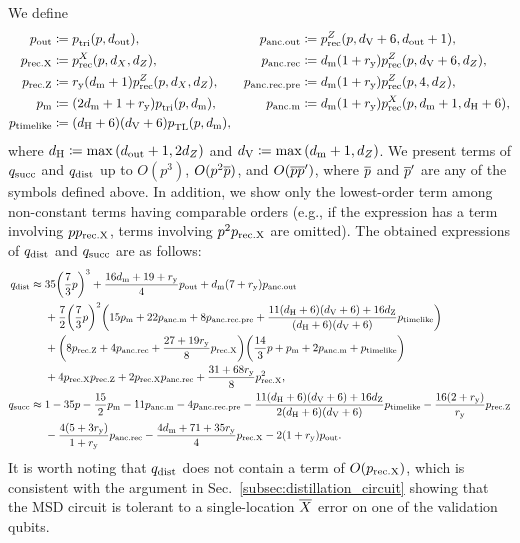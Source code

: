 \documentclass[
 prx,
 reprint,
 superscriptaddress,
 longbibliography,
 dvipsnames
]{revtex4-2}
\begin{document}
\begin{widetext}
We define
\begin{align*}
    p_{\mathrm{out}} &\coloneqq p_{\mathrm{tri}}^{}(p, d_{\mathrm{out}}), & p_{\mathrm{anc.out}} &\coloneqq p_{\mathrm{rec}}^{Z}(p, d_{\mathrm{V}} + 6, d_{\mathrm{out}} + 1), \\
    p_{\mathrm{rec.X}} &\coloneqq p_{\mathrm{rec}}^{X}(p, {d_X}, {d_Z}), & p_{\mathrm{anc.rec}} &\coloneqq d_{\mathrm{m}}(1 + r_{\mathrm{y}})p_{\mathrm{rec}}^{Z}(p, d_{\mathrm{V}} + 6, {d_Z}), \\
    p_{\mathrm{rec.Z}} &\coloneqq r_{\mathrm{y}} (d_{\mathrm{m}} + 1) p_{\mathrm{rec}}^{Z}(p, {d_X}, {d_Z}), & p_{\mathrm{anc.rec.pre}} &\coloneqq d_{\mathrm{m}}(1 + r_{\mathrm{y}})p_{\mathrm{rec}}^{Z}(p, 4, {d_Z}),\\
    p_{\mathrm{m}} &\coloneqq (2d_{\mathrm{m}} + 1 + r_{\mathrm{y}}) p_{\mathrm{tri}}^{}(p, d_{\mathrm{m}}), & p_{\mathrm{anc.m}} &\coloneqq d_{\mathrm{m}}(1 + r_{\mathrm{y}})p_{\mathrm{rec}}^{X}(p, d_{\mathrm{m}} + 1, d_{\mathrm{H}} + 6), \\
    p_{\mathrm{timelike}} &\coloneqq (d_{\mathrm{H}} + 6)(d_{\mathrm{V}} + 6)p_{\mathrm{TL}}^{}(p, d_{\mathrm{m}}), & &
\end{align*}
where $d_{\mathrm{H}} \coloneqq \max\qty(d_{\mathrm{out}}+1, 2{d_Z})$ and $d_{\mathrm{V}} \coloneqq \max\qty(d_{\mathrm{m}}+1, {d_Z})$.
We present terms of $q_{\mathrm{succ}}$ and $q_{\mathrm{dist}}$ up to $O(p^3)$, $O(p^2\overline{p})$, and $O(\overline{p}\overline{p}')$, where $\overline{p}$ and $\overline{p}'$ are any of the symbols defined above.
In addition, we show only the lowest-order term among non-constant terms having comparable orders (e.g., if the expression has a term involving $p p_{\mathrm{rec.X}}$, terms involving $p^2 p_{\mathrm{rec.X}}$ are omitted).
The obtained expressions of $q_{\mathrm{dist}}$ and $q_{\mathrm{succ}}$ are as follows:
\begin{align*}
    q_{\mathrm{dist}} \approx {}& 35 \qty(\frac{7}{3}p)^{3}
    + \frac{16 d_{\mathrm{m}} + 19 + r_{\mathrm{y}}}{4} p_{\mathrm{out}}
    + d_{\mathrm{m}} \qty(7 + r_{\mathrm{y}}) p_{\mathrm{anc.out}} \\
    &+ \frac{7}{2} \qty(\frac{7}{3}p)^{2} \qty(15  p_{\mathrm{m}} + 22 p_{\mathrm{anc.m}} + 8 p_{\mathrm{anc.rec.pre}} + \frac{11\qty(d_{\mathrm{H}} + 6) \qty(d_{\mathrm{V}} + 6) + 16 d_{\mathrm{Z}}}{\qty(d_{\mathrm{H}} + 6) \qty(d_{\mathrm{V}} + 6)} p_{\mathrm{timelike}}) \\
    &+ \qty(8p_{\mathrm{rec.Z}} + 4p_{\mathrm{anc.rec}} + \frac{27 + 19r_{\mathrm{y}}}{8} p_{\mathrm{rec.X}})\qty(\frac{14}{3}p + p_{\mathrm{m}} + 2p_{\mathrm{anc.m}} + p_{\mathrm{timelike}}) \\
    &+ 4 p_{\mathrm{rec.X}} p_{\mathrm{rec.Z}}
    + 2 p_{\mathrm{rec.X}} p_{\mathrm{anc.rec}}
    + \frac{31 + 68 r_{\mathrm{y}}}{8} p_{\mathrm{rec.X}}^{2}, \\
    q_{\mathrm{succ}} \approx {}&  1 - 35p
    - \frac{15}{2} p_{\mathrm{m}}
    - 11 p_{\mathrm{anc.m}}
    - 4 p_{\mathrm{anc.rec.pre}}
    - \frac{11\qty(d_{\mathrm{H}} + 6) \qty(d_{\mathrm{V}} + 6) + 16 d_{\mathrm{Z}}}{2 \qty(d_{\mathrm{H}} + 6) \qty(d_{\mathrm{V}} + 6)} p_{\mathrm{timelike}}
    - \frac{16 \qty(2 + r_{\mathrm{y}})}{r_{\mathrm{y}}} p_{\mathrm{rec.Z}} \\
    &- \frac{4 \qty(5 + 3 r_{\mathrm{y}})}{1 + r_{\mathrm{y}}} p_{\mathrm{anc.rec}}
    - \frac{4 d_{\mathrm{m}} + 71 + 35 r_{\mathrm{y}}}{4} p_{\mathrm{rec.X}}
    - 2 \qty(1 + r_{\mathrm{y}}) p_{\mathrm{out}}.
\end{align*}
It is worth noting that $q_{\mathrm{dist}}$ does not contain a term of $O(p_{\mathrm{rec.X}})$, which is consistent with the argument in Sec.~\ref{subsec:distillation_circuit} showing that the MSD circuit is tolerant to a single-location $\overline{X}$ error on one of the validation qubits.


\end{widetext}
\end{document}
